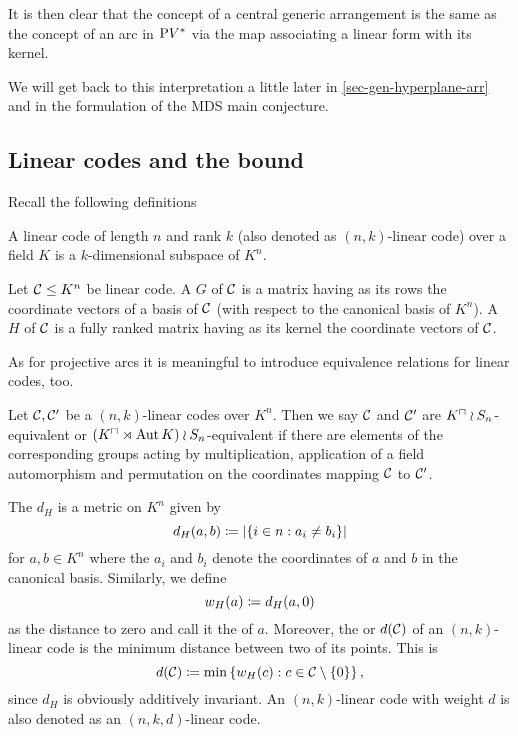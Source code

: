 \begin{remark}
    It is then clear that the concept of a central generic arrangement is the same as the concept of an arc in $\P \dual V$ via the map associating a linear form with its kernel.
\end{remark}

We will get back to this interpretation a little later in \autoref{sec-gen-hyperplane-arr} and in the formulation of the MDS main conjecture.

\subsection{Linear codes and the  bound}

Recall the following definitions

\begin{definition}
    A linear code of length $n$ and rank $k$ (also denoted as $(n,k)$-linear code) over a field $K$ is a $k$-dimensional subspace of $K^n$.  
\end{definition}

\begin{definition}
    Let $\mathcal{C}\leq K^n$ be linear code. A  $G$ of $\mathcal{C}$ is a matrix having as its rows the coordinate vectors of a basis of $\mathcal{C}$ (with respect to the canonical basis of $K^n$). A  $H$ of $\mathcal{C}$ is a fully ranked matrix having as its kernel the coordinate vectors of $\mathcal{C}$.
\end{definition}

As for projective arcs it is meaningful to introduce equivalence relations for linear codes, too.
\begin{definition}
    Let $\mathcal{C},\mathcal{C}'$ be a $(n,k)$-linear codes over $K^n$. Then we say $\mathcal{C}$ and $\mathcal{C}'$ are $\units K\wr S_n$-equivalent or $(\units K\rtimes\Aut K)\wr S_n$-equivalent if there are elements of the corresponding groups acting by multiplication, application of a field automorphism and permutation on the coordinates mapping $\mathcal{C}$ to $\mathcal{C}'$.
\end{definition}


\begin{definition}
    The  $d_H$ is a metric on $K^n$ given by
    $$
    d_H(a,b)\defeq\card{\set{i\in n}[a_i\neq b_i]}
    $$
    for $a,b\in K^n$ where the $a_i$ and $b_i$ denote the coordinates of $a$ and $b$ in the canonical basis.
    Similarly, we define
    $$
    w_H(a)\mathrel{\mathrel{\mathop:}\mkern-1.2mu=} d_H(a,0)
    $$
    as the  distance to zero and call it the  of $a$.
    Moreover, the  or  $d(\mathcal{C})$ of an $(n,k)$-linear code is the minimum  distance between two of its points.
    This is
    $$
    d(\cC)\defeq \min\set{w_H(c)}[c\in\cC\setminus\set{0}],
    $$
    since $d_H$ is obviously additively invariant.
    An $(n,k)$-linear code with  weight $d$ is also denoted as an $(n,k,d)$-linear code.
\end{definition}

